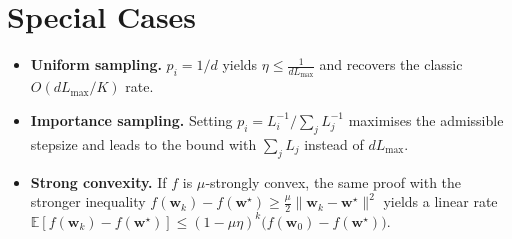 \documentclass{article}
\newcommand{\E}{\mathbb{E}}
\newcommand{\w}{\mathbf{w}}
\begin{document}
\section*{Special Cases}
\begin{itemize}[leftmargin=*]
\item \textbf{Uniform sampling.} $p_{i}=1/d$ yields $\eta\le \frac{1}{dL_{\max}}$ and recovers the classic $O(dL_{\max}/K)$ rate.
\item \textbf{Importance sampling.} Setting $p_{i}=L_{i}^{-1}\big/\sum_{j}L_{j}^{-1}$ maximises the admissible stepsize and leads to the bound with $\sum_{j}L_{j}$ instead of $dL_{\max}$.
\item \textbf{Strong convexity.} If $f$ is $\mu$‑strongly convex, the same proof with the stronger inequality 
$f(\w_{k})-f(\w^{\star})\ge \frac{\mu}{2}\|\w_{k}-\w^{\star}\|^{2}$ yields a linear rate
$\E[f(\w_{k})-f(\w^{\star})]\le (1-\mu\eta)^{k}\bigl(f(\w_{0})-f(\w^{\star})\bigr)$.
\end{itemize}
\end{document}
